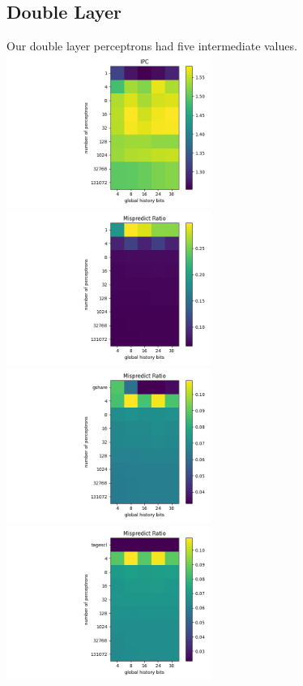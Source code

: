 \documentclass{article}
\begin{document}
\subsection*{Double Layer}
Our double layer perceptrons had five intermediate values.
\includegraphics[width=0.5\textwidth]{./cse220data/data_2_layer/matrix_ipc_all.png}
\includegraphics[width=0.5\textwidth]{./cse220data/data_2_layer/matrix_mispred_all.png}
\includegraphics[width=0.5\textwidth]{./cse220data/data_2_layer/matrix_mispred_gshare.png}
\includegraphics[width=0.5\textwidth]{./cse220data/data_2_layer/matrix_mispred_tagescl.png}
\end{document}
